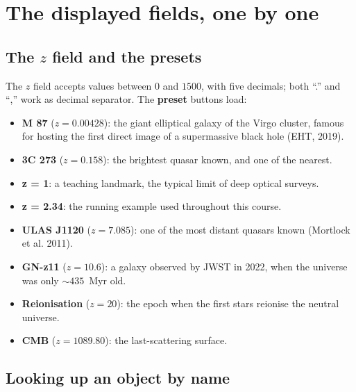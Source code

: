 \documentclass[11pt,a4paper,openany]{report}
\begin{document}
\section{The displayed fields, one by one}

\subsection{The $z$ field and the presets}

\begin{tcolorbox}[gui]
The $z$ field accepts values between $0$ and $1500$, with five decimals; both
“.” and “,” work as decimal separator. The \textbf{preset} buttons load:
\begin{itemize}[topsep=2pt]
\item \textbf{M 87} ($z=0.00428$): the giant elliptical galaxy of the Virgo
  cluster, famous for hosting the first direct image of a supermassive black
  hole (EHT, 2019).
\item \textbf{3C 273} ($z=0.158$): the brightest quasar known, and one of the
  nearest.
\item \textbf{z = 1}: a teaching landmark, the typical limit of deep optical
  surveys.
\item \textbf{z = 2.34}: the running example used throughout this course.
\item \textbf{ULAS J1120} ($z = 7.085$): one of the most distant quasars known
  (Mortlock et al. 2011).
\item \textbf{GN-z11} ($z=10.6$): a galaxy observed by JWST in 2022, when the
  universe was only $\sim 435$~Myr old.
\item \textbf{Reionisation} ($z=20$): the epoch when the first stars reionise
  the neutral universe.
\item \textbf{CMB} ($z=1089.80$): the last-scattering surface.
\end{itemize}
\end{tcolorbox}

\subsection{Looking up an object by name}
\label{sec:simbad}
\end{document}
